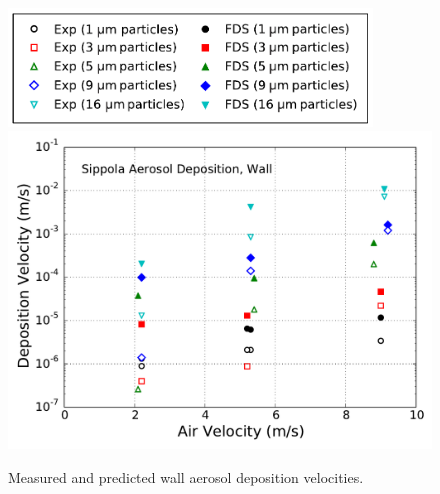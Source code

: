 \begin{figure}[p]
\includegraphics[width=3.8in]{Fig_Sippola_Aerosol_Deposition_Legend.pdf} \\
\includegraphics[width=5.0in]{Fig_Sippola_Aerosol_Wall_Deposition.pdf}
\caption[Wall aerosol deposition velocities]
{Measured and predicted wall aerosol deposition velocities.}
\label{fig:Sippola_Aerosol_Deposition_Velocity_2}
\end{figure}

